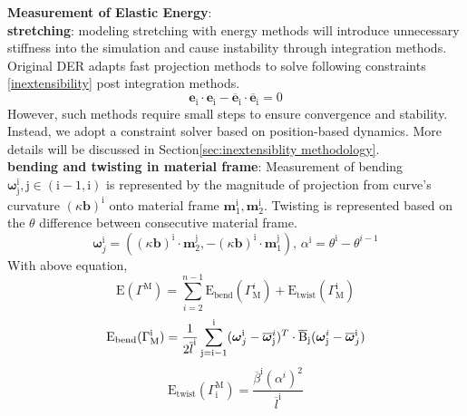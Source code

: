 \textbf{Measurement of Elastic Energy}: \\
\textbf{stretching}: modeling stretching with energy methods will introduce unnecessary stiffness into the simulation and cause instability through integration methods. Original DER\cite{originalDER} adapts fast projection methods\cite{fast_proj} to solve following constraints \ref{inextensibility} post integration methods. 
\begin{equation}
    \textbf{e}_\text{i} \cdot \textbf{e}_\text{i} - \overline{\textbf{e}}_\text{i}\cdot\overline{\textbf{e}}_\text{i} = 0
\label{inextensibility}
\end{equation}
However, such methods require small steps to ensure convergence and stability. 
Instead, we adopt a constraint solver based on position-based dynamics\cite{PBD}.  
More details will be discussed in Section\ref{sec:inextensiblity methodology}. \\
\textbf{bending and twisting in material frame}: 
Measurement of bending $\boldsymbol{\omega}_\text{j}^\text{i}, \text{j}\in(\text{i}-1, \text{i})$ is represented by the magnitude of projection from curve's curvature $(\kappa\textbf{b})^\text{i}$ onto material frame $\textbf{m}_1^\text{i}, \textbf{m}_2^\text{i}$. Twisting is represented based on the $\theta$ difference between consecutive material frame.
\begin{equation}
    \boldsymbol{\omega}_j^\text{i} = ((\kappa\textbf{b})^\text{i}\cdot \textbf{m}_2^\text{j}, -(\kappa\textbf{b})^\text{i}\cdot \textbf{m}_1^\text{j}), \, \alpha^\text{i} = \theta^\text{i} - \theta^{i-1}
    \label{eq:bend and twist}
\end{equation}
With above equation, 
\begin{equation}
    \text{E}(\Gamma^\text{M}) = \sum^{n-1}_{i=2}\text{E}_{\text{bend}}(\Gamma_\text{M}^{i}) + \text{E}_{\text{twist}}(\Gamma_\text{M}^\text{i})
    \label{eq: total_energy}
\end{equation}
\begin{equation}
    \text{E}_{\text{bend}}(\Gamma^\text{i}_\text{M}) = \frac{1}{2\overline{l}^\text{i}}\sum^\text{i}_{\text{j}=\text{i}-1} (\boldsymbol{\omega}_j^\text{i} - \overline{\boldsymbol{\omega}}^i_\text{j})^T \cdot \overline{\text{B}}_\text{j} (\boldsymbol{\omega}^i_\text{j} - \overline{\boldsymbol{\omega}}_j^\text{i})\\
    \label{eq:bend_energy}
\end{equation}
\begin{equation}
        \text{E}_{\text{twist}}(\Gamma_\text{i}^\text{M}) = \frac{\overline{\beta}^\text{i}(\alpha^i)^2}{\overline{l}^\text{i}}
        \label{eq:twist_energy}
\end{equation}
